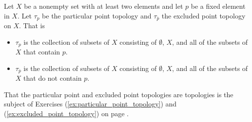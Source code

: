 \begin{comment}

\ExerciseSolution Let $A$ a subset of of a topological space $X$. First we show that $\Bdry(A) = \emptyset$ implies that $A$ is open and closed. Assume $\Bdry(A) = \overline{A} \cap \overline{X \setminus A} = \emptyset.$ To prove that $A$ is closed, we will demonstrate that $A = \overline{A}.$ Since we know that $A \subset \overline{A}$ for any set $A$, we only need show that $\overline{A} \subset A.$ We proceed by contradiction. Assume $\overline{A} \not\subset A,$ that is there exists a point $x \in \overline{A} \setminus A.$ Thus, $x$ is in both $\overline{A}$ and $X \setminus A$. We know that $X \setminus A \subset \overline{X \setminus A},$ so $x \in \overline{X \setminus A}.$ Therefore, $x \in \overline{A} \cap \overline{X \setminus A} = \Bdry(A).$ This is a contradiction to our assumption that $\Bdry(A) = \emptyset.$ Therefore we must have that $\overline{A} \subset A$ and $A$ is closed. 

To show $A$ is open, we will demonstrate that $X \setminus A$ is closed. Let $B = X \setminus A$. Note that 
\[\Bdry(B) = \overline{B} \cap \overline{X \setminus B)} = \overline{X \setminus A} \cap \overline{A} = \Bdry(A) = \emptyset.\]
The proof in the previous paragraph shows that $B = X \setminus A$ is closed. Therefore, $A$ is open. 

For the converse, assume that $A$ is both open and closed. Then $A$ and $X \setminus A$ are closed. So $\overline{A} = A$ and $\overline{X \setminus A} = X \setminus A$. So 
\[\Bdry(A) = \overline{A} \cap \overline{X \setminus A} = A \cap (X \setminus A) = \emptyset.\]

\end{comment}


\item Let $X$ be a nonempty set with at least two elements and let $p$ be a fixed element in $X$. Let $\tau_p$ be the particular point topology and $\tau_{\overline{p}}$ the excluded point topology on $X$. That is
\begin{itemize}
\item $\tau_{p}$ is the collection of subsets of $X$ consisting of $\emptyset$, $X$, and all of the subsets of $X$ that contain $p$.  
\item $\tau_{\overline{p}}$ is the collection of subsets of $X$ consisting of $\emptyset$, $X$, and all of the subsets of $X$ that do not contain $p$. 
\end{itemize}
That the particular point and excluded point topologies are topologies is the subject of Exercises (\ref{ex:particular_point_topology}) and (\ref{ex:excluded_point_topology}) on page \pageref{ex:particular_point_topology}. 


